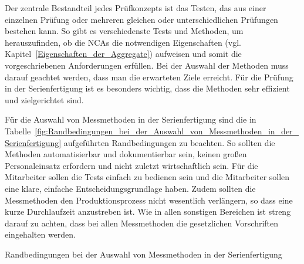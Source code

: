 Der zentrale Bestandteil jedes Prüfkonzepts ist das Testen, das aus einer einzelnen Prüfung oder mehreren gleichen oder unterschiedlichen Prüfungen bestehen kann. So gibt es verschiedenste Tests und Methoden, um herauszufinden, ob die NCAs die notwendigen Eigenschaften (vgl. Kapitel~\ref{Eigenschaften_der_Aggregate}) aufweisen und somit die vorgeschriebenen Anforderungen erfüllen. Bei der Auswahl der Methoden muss darauf geachtet werden, dass man die erwarteten Ziele erreicht. Für die Prüfung in der Serienfertigung ist es besonders wichtig, dass die Methoden sehr effizient und zielgerichtet sind.


Für die Auswahl von Messmethoden in der Serienfertigung sind die in Tabelle~\ref{fig:Randbedingungen_bei_der_Auswahl_von_Messmethoden_in_der_Serienfertigung} aufgeführten Randbedingungen zu beachten. So sollten die Methoden automatisierbar und dokumentierbar sein, keinen großen Personaleinsatz erfordern und nicht zuletzt wirtschaftlich sein. Für die Mitarbeiter sollen die Tests einfach zu bedienen sein und die Mitarbeiter sollen eine klare, einfache Entscheidungsgrundlage haben. Zudem sollten die Messmethoden den Produktionsprozess nicht wesentlich verlängern, so dass eine kurze Durchlaufzeit anzustreben ist. Wie in allen sonstigen Bereichen ist streng darauf zu achten, dass bei allen Messmethoden die gesetzlichen Vorschriften eingehalten werden.











\begin{table}[H]
\center
{}
\caption{Randbedingungen bei der Auswahl von Messmethoden in der Serienfertigung}
\label{fig:Randbedingungen_bei_der_Auswahl_von_Messmethoden_in_der_Serienfertigung}
\end{table}















